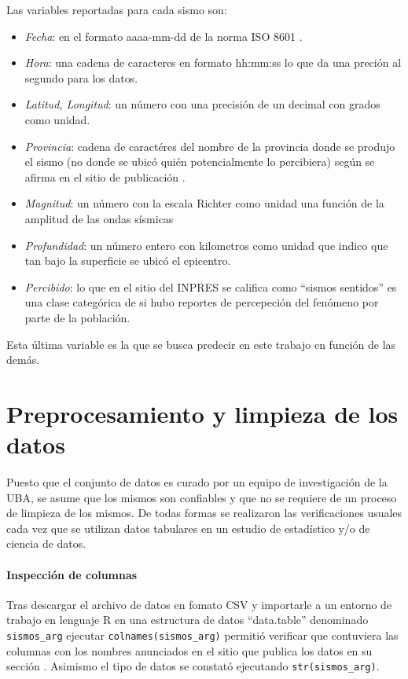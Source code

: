 \documentclass[a4paper]{report}
\begin{document}
Las variables reportadas para cada sismo son:
\begin{itemize}
	\item \emph{Fecha}: en el formato aaaa-mm-dd de la norma ISO 8601 \cite{noauthor_iso_2019}.
	\item \emph{Hora}: una cadena de caracteres en formato hh:mm:ss lo que da una preción al segundo para los datos.
	\item \emph{Latitud, Longitud}: un número con una precisión de un decimal con grados como unidad.
	\item \emph{Provincia}: cadena de caractéres del nombre de la provincia donde se produjo el sismo (no donde se ubicó quién potencialmente lo percibiera) según se afirma en el sitio de publicación \cite[5.1.1]{daniela_parada_ic-datasets-docencia_nodate}.
	\item \emph{Magnitud}: un número con la escala Richter como unidad una función de la amplitud de las ondas sísmicas \cite[sección 4.2.3]{fowler_solid_2004}
	\item \emph{Profundidad}: un número entero con kilometros como unidad que indico que tan bajo la superficie se ubicó el epicentro.
	\item \emph{Percibido}: lo que en el sitio del INPRES se califica como ``sismos sentidos'' es una clase categórica de si hubo reportes de percepeción del fenómeno por parte de la población. 
\end{itemize}
Esta última variable es la que se busca predecir en este trabajo en función de las demás. 



\section{Preprocesamiento y limpieza de los datos}

Puesto que el conjunto de datos es curado por un equipo de investigación de la UBA, se asume que los mismos son confiables y que no se requiere de un proceso de limpieza de los mismos.
De todas formas se realizaron las verificaciones usuales cada vez que se utilizan datos tabulares en un estudio de estadístico y/o de ciencia de datos.

\paragraph{Inspección de columnas}
Tras descargar el archivo de datos en fomato CSV y importarle a un entorno de trabajo en lenguaje R en una estructura de datos ``data.table'' denominado \verb'sismos_arg' ejecutar \verb'colnames(sismos_arg)' permitió verificar que contuviera las columnas con los nombres anunciados en el sitio que publica los datos en su sección \cite[Exploración inicial]{daniela_parada_ic-datasets-docencia_nodate}.
Asimismo el tipo de datos se constató ejecutando \verb'str(sismos_arg)'.
\end{document}
